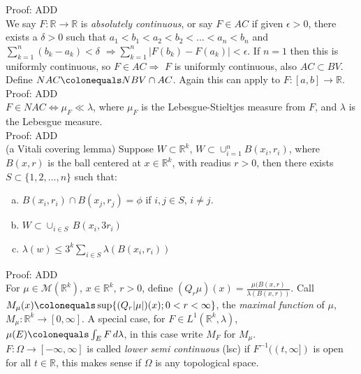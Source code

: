 \documentclass[12pt]{article}
\newcommand{\rimply}[0] { \Rightarrow }
\newcommand{\lrimply}[0] { \Leftrightarrow }
\newcommand{\rarw}[0] { \rightarrow }
\newcommand{ \defeq }[0] { \colonequals }
\newcommand{\reals}[0] { \mathbb{R}}
\newcommand{\eps}[0] {  \epsilon }
\newcommand{\Om}[0] { \Omega }
\newcommand{\M}[0] { \mathcal{M} }
\begin{document}
\noindent
Proof: ADD \\

We say $F: \reals \rarw \reals$ is \emph{absolutely continuous}, or say $F \in AC$ if given $\eps>0$, there exists a $\delta>0$ such that $a_1 < b_1 < a_2 < b_2 < ... < a_n < b_n$ and $\sum_{k=1}^n (b_k-a_k) < \delta$ $\rimply \sum_{k=1}^n |F(b_k) - F(a_k)| < \eps$. If $n=1$ then this is uniformly continuous, so $F \in AC \rimply$ $F$ is uniformly continuous, also $AC \subset BV$. Define $NAC \defeq NBV \cap AC$. Again this can apply to $F: [a,b] \rarw \reals$. \\

\noindent
Proof: ADD \\

$F \in NAC \lrimply \mu_F \ll \lambda$, where $\mu_F$ is the Lebesgue-Stieltjes measure from $F$, and $\lambda$ is the Lebesgue measure. \\


\noindent
Proof: ADD \\



(a Vitali covering lemma) Suppose $W \subset \reals^k$, $W \subset \cup_{i=1}^n B(x_i, r_i)$, where $B(x,r)$ is the ball centered at $x \in \reals^k$, with readius $r>0$, then there exists $S \subset \{ 1,2,...,n\}$ such that:

\begin{enumerate}[a)]
\item
$B(x_i, r_i) \cap B(x_j, r_j) = \phi$ if $i,j \in S$, $i \not = j$.
\item
$ W \subset \cup_{i \in S} \, B(x_i, 3 r_i)$
\item
$ \lambda(w) \le 3^k \sum_{i \in S} \lambda(B(x_i, r_i )) $
\end{enumerate}


\noindent
Proof: ADD \\


For $ \mu \in \M(\reals^k)$, $x \in \reals^k$, $r > 0$, define $(Q_r \mu)(x) = \frac{\mu(B(x,r)}{\lambda(B(x,r))}$. Call $ M_\mu(x) \defeq \sup \{ (Q_r|\mu|)(x); 0 < r < \infty \}$, the \emph{maximal function} of $\mu$, $M_\mu: \reals^k \rarw [0, \infty]$. A special case, for $F \in L^1(\reals^k, \lambda)$, $\mu(E) \defeq \int_E F \, d\lambda$, in this case write $M_F$ for $M_\mu$.  \\


$F: \Om \rarw [-\infty, \infty]$ is called \emph{lower semi continuous} (lsc) if $F^{-1}((t,\infty])$ is open for all $t \in \reals$, this makes sense if $\Om$ is any topological space. \\
\end{document}
